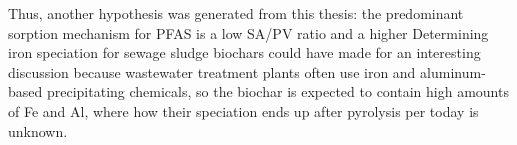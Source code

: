 Thus, another hypothesis was generated from this thesis: the predominant sorption mechanism for PFAS is a low SA/PV ratio and a higher  
Determining iron speciation for sewage sludge biochars could have made for an interesting discussion because wastewater treatment plants often use iron and aluminum-based precipitating chemicals, so the biochar is expected to contain high amounts of Fe and Al, where how their speciation ends up after pyrolysis per today is unknown.